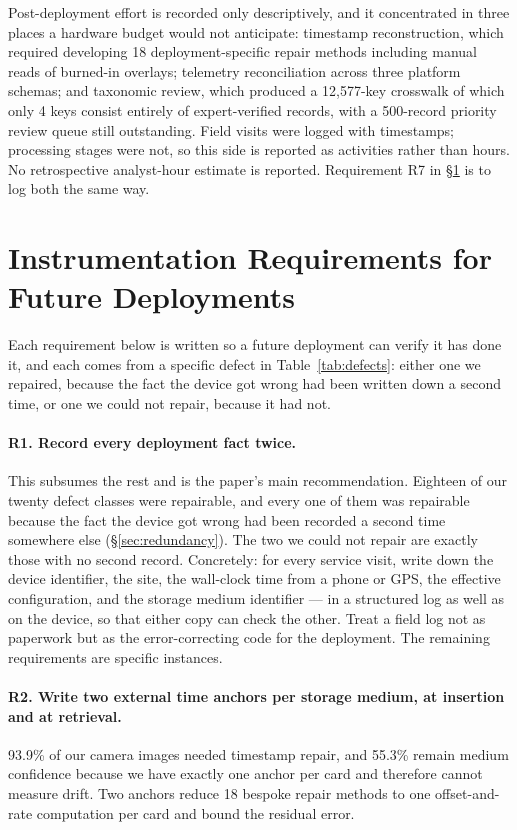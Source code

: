 \documentclass[sigconf]{acmart}
\begin{document}
Post-deployment effort is recorded only descriptively, and it
concentrated in three places a hardware budget would not anticipate:
timestamp reconstruction, which required developing 18
deployment-specific repair methods including manual reads of burned-in
overlays; telemetry reconciliation across three platform schemas; and
taxonomic review, which produced a 12{,}577-key crosswalk of which only
4 keys consist entirely of expert-verified records, with a 500-record
priority review queue still outstanding. Field visits were logged with
timestamps; processing stages were not, so this side is reported as
activities rather than hours. No retrospective analyst-hour estimate is
reported. Requirement R7 in \S\ref{sec:lessons} is to log both the same way.

\section{Instrumentation Requirements for Future Deployments}
\label{sec:lessons}

Each requirement below is written so a future deployment can verify it
has done it, and each comes from a specific defect in
Table~\ref{tab:defects}: either one we repaired, because the fact the
device got wrong had been written down a second time, or one we could
not repair, because it had not.

\paragraph{R1. Record every deployment fact twice.}
This subsumes the rest and is the paper's main recommendation.
Eighteen of our twenty defect classes were repairable, and every one
of them was repairable because the fact the device got wrong had been
recorded a second time somewhere else (\S\ref{sec:redundancy}).
The two we could not repair are exactly those with no second record.
Concretely: for every service visit, write down the device identifier,
the site, the wall-clock time from a phone or GPS, the effective
configuration, and the storage medium identifier --- in a structured log
as well as on the device, so that either copy can check the other. Treat a field log not as paperwork but as the
error-correcting code for the deployment. The remaining requirements are
specific instances.

\paragraph{R2. Write two external time anchors per storage medium, at
insertion and at retrieval.}
93.9\% of our camera images needed timestamp repair, and 55.3\% remain
medium confidence because we have exactly one anchor per card and
therefore cannot measure drift. Two anchors reduce 18 bespoke repair
methods to one offset-and-rate computation per card and bound the
residual error.
\end{document}
